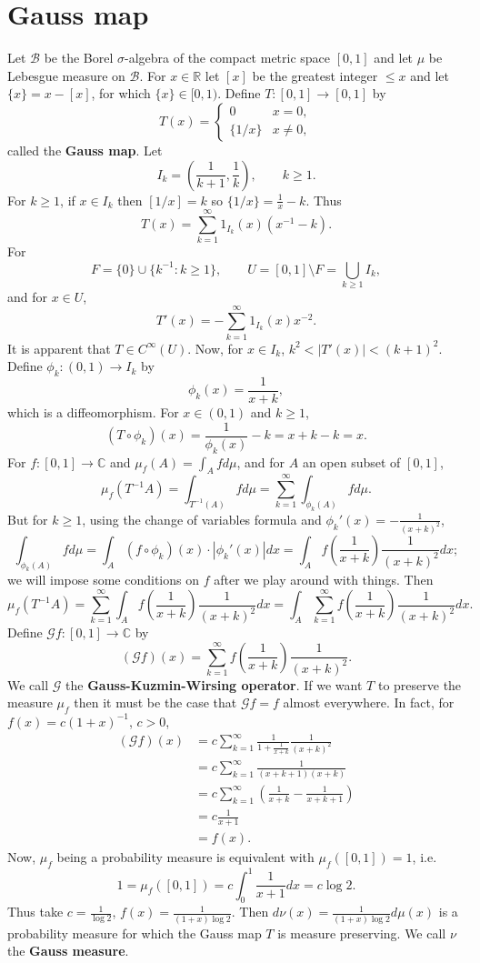 \documentclass{article}
\theoremstyle{definition}
\begin{document}
\section{Gauss map}
Let $\mathscr{B}$ be the Borel $\sigma$-algebra of the compact metric space $[0,1]$ and let $\mu$ be Lebesgue measure
on $\mathscr{B}$. For $x \in \mathbb{R}$ let $[x]$ be the greatest integer $\leq x$ and let
$\{x\}=x-[x]$, for which $\{x\} \in [0,1)$. Define $T:[0,1] \to [0,1]$ by
\[
T(x) = \begin{cases}
0&x=0,\\
\{1/x\}&x \neq 0,
\end{cases}
\]
called the \textbf{Gauss map}. Let 
\[
 I_k= \left(\frac{1}{k+1},\frac{1}{k}\right),\qquad k \geq 1.
\]
For $k \geq 1$, if $x \in I_k$  then
$[1/x]=k$ so $\{1/x\} = \frac{1}{x}-k$. Thus
\[
T(x) = \sum_{k=1}^\infty 1_{I_k}(x) (x^{-1}-k).
\]
For
\[
F=\{0\} \cup \{k^{-1}: k \geq 1\},\qquad U= [0,1] \setminus F = \bigcup_{k \geq 1} I_k,
\]
and for $x \in U$,
\[
T'(x) = - \sum_{k=1}^\infty 1_{I_k}(x) x^{-2}.
\]
It is apparent that $T \in C^\infty(U)$. 
Now, for $x \in I_k$, $k^2 < |T'(x)| < (k+1)^2$.  
Define $\phi_k:(0,1) \to I_k$ by
\[
\phi_k(x) = \frac{1}{x+k},
\] 
which is a diffeomorphism.
For $x \in (0,1)$ and $k \geq 1$,
\[
(T \circ \phi_k)(x) = \frac{1}{\phi_k(x)} - k = x+k-k=x.
\]
For $f:[0,1] \to \mathbb{C}$ and $\mu_f(A) = \int_A f d\mu$, and for $A$ an open subset of $[0,1]$,
\[
\mu_f(T^{-1}A) = \int_{T^{-1}(A)} f d\mu = \sum_{k = 1}^\infty  \int_{\phi_k(A)} f d\mu.
\]
But for $k \geq 1$, using the change of variables formula and
$\phi_k'(x) = -\frac{1}{(x+k)^2}$,
\[
\int_{\phi_k(A)} f d\mu = \int_A (f \circ \phi_k)(x) \cdot |\phi_k'(x)| dx
=\int_A f\left(\frac{1}{x+k}\right) \frac{1}{(x+k)^2} dx;
\]
we will impose some conditions on $f$ after we play around with things.
Then
\[
\mu_f(T^{-1}A)  = \sum_{k=1}^\infty \int_A f\left(\frac{1}{x+k}\right) \frac{1}{(x+k)^2} dx
=\int_A  \sum_{k=1}^\infty  f\left(\frac{1}{x+k}\right) \frac{1}{(x+k)^2} dx.
\]
Define $\mathscr{G}f:[0,1] \to \mathbb{C}$ by
\[
(\mathscr{G}f)(x) = \sum_{k=1}^\infty  f\left(\frac{1}{x+k}\right) \frac{1}{(x+k)^2}.
\]
We call $\mathscr{G}$ the \textbf{Gauss-Kuzmin-Wirsing operator}.
If we want $T$ to preserve the measure $\mu_f$ then it must be the case that
$\mathscr{G}f=f$ almost everywhere.
In fact, for $f(x)= c(1+x)^{-1}$, $c>0$,
\begin{align*}
(\mathscr{G}f)(x)&=c \sum_{k=1}^\infty \frac{1}{1+\frac{1}{x+k}} \frac{1}{(x+k)^2}\\
&=c\sum_{k=1}^\infty \frac{1}{(x+k+1)(x+k)}\\
&=c\sum_{k=1}^\infty \left( \frac{1}{x+k} - \frac{1}{x+k+1}\right)\\
&=c\frac{1}{x+1}\\
&=f(x).
\end{align*}
Now,  $\mu_f$ being a  probability measure is equivalent with 
$\mu_f([0,1])=1$, i.e.
\[
1=\mu_f([0,1]) = c \int_0^1 \frac{1}{x+1} dx = c \log 2.
\]
Thus take $c=\frac{1}{\log 2}$, $f(x) = \frac{1}{(1+x)\log 2}$. 
Then $d\nu(x)=\frac{1}{(1+x)\log 2 } d\mu(x)$ is a probability measure for which the Gauss map
$T$ is measure preserving. We call $\nu$ the \textbf{Gauss measure}. 
\end{document}
